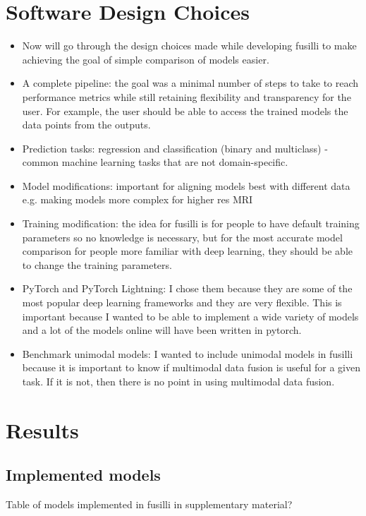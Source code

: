 \section{Software Design Choices}
\begin{itemize}
    \item Now will go through the design choices made while developing fusilli to make achieving the goal of simple comparison of models easier.
    \item A complete pipeline: the goal was a minimal number of steps to take to reach performance metrics while still retaining flexibility and transparency for the user. For example, the user should be able to access the trained models the data points from the outputs.
    \item Prediction tasks: regression and classification (binary and multiclass) - common machine learning tasks that are not domain-specific.
    \item Model modifications: important for aligning models best with different data e.g. making models more complex for higher res MRI
    \item Training modification: the idea for fusilli is for people to have default training parameters so no knowledge is necessary, but for the most accurate model comparison for people more familiar with deep learning, they should be able to change the training parameters.
    \item PyTorch and PyTorch Lightning: I chose them because they are some of the most popular deep learning frameworks and they are very flexible. This is important because I wanted to be able to implement a wide variety of models and a lot of the models online will have been written in pytorch.
    \item Benchmark unimodal models: I wanted to include unimodal models in fusilli because it is important to know if multimodal data fusion is useful for a given task. If it is not, then there is no point in using multimodal data fusion.
\end{itemize}

\section{Results}
\subsection{Implemented models}
Table of models implemented in fusilli in supplementary material?

